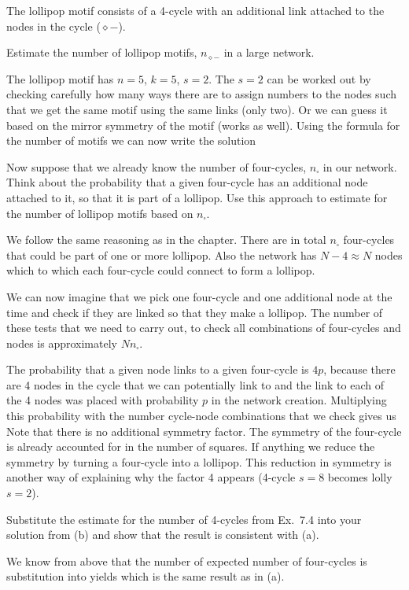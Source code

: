 The lollipop motif consists of a 4-cycle with an additional link attached to the nodes in the cycle ($\diamond -$). 

\subquestion Estimate the number of lollipop motifs, $n_{\diamond -}$ in a large network. 

\solution
The lollipop motif has $n=5$, $k=5$, $s=2$. The $s=2$ can be worked out by checking carefully how many ways there are to assign numbers to the nodes such that we get the same motif using the same links (only two). Or we can guess it based on the mirror symmetry of the motif (works as well). Using the formula for the number of motifs we can now write the solution

\subquestion Now suppose that we already know the number of four-cycles, $n_{\square}$ in our network. Think about the probability that a given four-cycle has an additional node attached to it, so that it is part of a lollipop. Use this approach to estimate for the number of lollipop motifs based on $n_{\square}$. 

\solution We follow the same reasoning as in the chapter. There are in total $n_\square$ four-cycles that could be part of one or more lollipop. Also the network has $N-4\approx N$ nodes which to which each four-cycle could connect to form a lollipop. 

We can now imagine that we pick one four-cycle and one additional node at the time and check if they are linked so that they make a lollipop. The number of these tests that we need to carry out, to check all combinations of four-cycles and nodes is approximately $Nn_{\square}$. 

The probability that a given node links to a given four-cycle is $4p$, because there are 4 nodes in the cycle that we can potentially link to and the link to each of the 4 nodes was placed with probability $p$ in the network creation. 
Multiplying this probability with the number cycle-node combinations that we check gives us
Note that there is no additional symmetry factor. The symmetry of the four-cycle is already accounted for in the number of squares. If anything we reduce the symmetry by turning a four-cycle into a lollipop. This reduction in symmetry is another way of explaining why the factor 4 appears (4-cycle $s=8$ becomes lolly $s=2$). 

\subquestion Substitute the estimate for the number of 4-cycles from  Ex.~7.4 into your solution from (b) and show that the result is consistent with (a).  

\solution 
We know from above that the number of expected number of four-cycles is 
substitution into 
yields
which is the same result as in (a).

\solutionend

